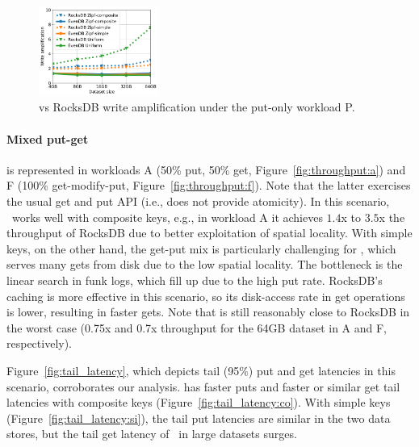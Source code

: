 \begin{figure}[t]
	\centering
	\includegraphics[width=0.35\textwidth]{figs/write_amp_p_line.pdf}
	\caption{{\sys\/ vs RocksDB write amplification under the put-only workload P.}}
	\label{fig:writeamp}
\end{figure}


\paragraph{ Mixed put-get} is represented in workloads A (50\% put, 50\% get, Figure~\ref{fig:throughput:a}) and 
F (100\% get-modify-put, Figure~\ref{fig:throughput:f}). Note that the latter exercises the usual get and put API (i.e., does not provide atomicity). 
In this scenario, \sys\ works well with composite keys, e.g., in workload A it  achieves $1.4$x to $3.5$x the throughput of RocksDB due to better exploitation of spatial locality. 
With simple keys, on the other hand, the get-put mix is particularly challenging for \sys, which serves many gets from disk due to the
low spatial locality. The bottleneck is the linear search in funk logs, which  fill
up due to the high put rate.
RocksDB's caching is more effective in this scenario, so its disk-access rate in get operations is lower,  resulting in faster gets. 
Note that \sys\/ is still reasonably close to RocksDB in the worst case 
(0.75x and 0.7x throughput for the 64GB dataset in A and F, respectively).

Figure~\ref{fig:tail_latency}, which depicts tail (95\%) put and get latencies in this scenario, 
corroborates our analysis. \sys\/ has faster puts and faster or similar get tail latencies with composite keys
(Figure~\ref{fig:tail_latency:co}). With simple keys (Figure~\ref{fig:tail_latency:si}),  
the tail put latencies are similar in the two data stores, but the tail get latency of \sys\ 
in large datasets surges.

